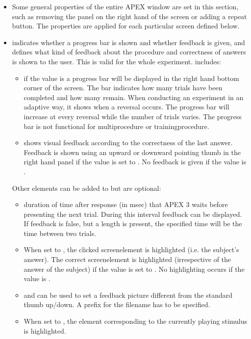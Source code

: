 \begin{itemize}
\item {} Some general properties of the entire APEX window are set in this section, such as removing the panel on the right hand of the screen or adding a repeat button. The properties are applied for each particular screen defined below.
\item {} indicates whether a progress bar is
shown and whether feedback is given, and defines what kind of feedback about the procedure and correctness of answers is shown to the user. This is valid for the whole experiment.
 includes:

\begin{itemize}
\item {} if the value is  a progress bar will be displayed in the right hand bottom corner of the screen. The bar indicates how many trials have been completed and how many remain. When conducting an experiment in an adaptive way, it shows when a reversal occurs. The progress bar will increase at every reversal while the number of trials varies. The progress bar is not functional for multiprocedure or trainingprocedure.

\item {} shows visual feedback according to the correctness of the last answer. Feedback is shown using an upward or downward pointing thumb in the right hand panel if the value is set to . No feedback is given if the value is .

\end{itemize}

Other elements can be added to  but are optional:
\begin{itemize}
\item {} duration of time after response (in msec) that APEX 3 waits before presenting the next trial. During this interval feedback can be displayed. If feedback is false, but a length is present, the specified time will be the time between two trials.
\item {} When set to , the clicked screenelement is highlighted (i.e. the subject’s answer). The correct screenelement is highlighted (irrespective of the answer of the subject) if the value is set to . No highlighting occurs if the value is .
\item {} and  can be used to set a feedback picture different from the standard thumb up/down. A prefix for the filename has to be specified.
\item {} When set to , the element corresponding to the currently playing stimulus is highlighted.
\end{itemize}


\end{itemize}
